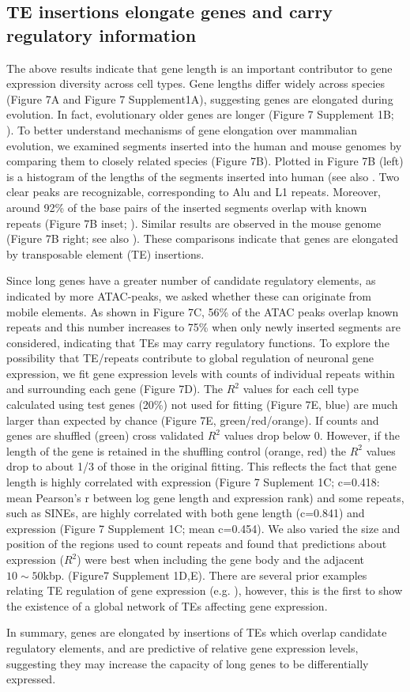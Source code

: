 \subsection{TE insertions elongate genes and carry regulatory information}

The above results indicate that gene length is an important contributor to gene expression diversity across cell types. Gene lengths differ widely across species (Figure 7A and Figure 7 Supplement1A), suggesting genes are elongated during evolution. In fact, evolutionary older genes are longer (Figure 7 Supplement 1B; \cite{Grishkevich_2014}). To better understand mechanisms of gene elongation over mammalian evolution, we examined segments inserted into the human and mouse genomes by comparing them to closely related species (Figure 7B). Plotted in Figure 7B (left) is a histogram of the lengths of the segments inserted into human (see also \cite{Mikkelsen_2005}. Two clear peaks are recognizable, corresponding to Alu and L1 repeats. Moreover, around 92\% of the base pairs of the inserted segments overlap with known repeats (Figure 7B inset; \cite{Bao_2015}). Similar results are observed in the mouse genome (Figure 7B right; see also \cite{Pozzoli_2007}). These comparisons indicate that genes are elongated by transposable element (TE) insertions. 

Since long genes have a greater number of candidate regulatory elements, as indicated by more ATAC-peaks, we asked whether these can originate from mobile elements. As shown in Figure 7C, 56\% of the ATAC peaks overlap known repeats and this number increases to 75\% when only newly inserted segments are considered, indicating that TEs may carry regulatory functions. To explore the possibility that TE/repeats contribute to global regulation of neuronal gene expression, we fit gene expression levels with counts of individual repeats within and surrounding each gene (Figure 7D).  The $R^2$ values for each cell type calculated using test genes (20\%) not used for fitting (Figure 7E, blue) are much larger than expected by chance (Figure 7E, green/red/orange). If counts and genes are shuffled (green) cross validated $R^2$ values drop below 0. However, if the length of the gene is retained in the shuffling control (orange, red) the $R^2$ values drop to about 1/3 of those in the original fitting. This reflects the fact that gene length is highly correlated with expression (Figure 7 Suplement 1C; c=0.418: mean Pearson's r between log gene length and expression rank) and some repeats, such as SINEs, are highly correlated with both gene length (c=0.841) and expression (Figure 7 Supplement 1C; mean c=0.454). We also varied the size and position of the regions used to count repeats and found that predictions about expression ($R^2$) were best when including the gene body and the adjacent $10\sim 50$kbp. (Figure7 Supplement 1D,E). There are several prior examples relating TE regulation of gene expression (e.g. \cite{Han_2004,Chuong_2016a}), however, this is the first to show the existence of a global network of TEs affecting gene expression. 

In summary, genes are elongated by insertions of TEs which overlap candidate regulatory elements, and are predictive of relative gene expression levels, suggesting they may increase the capacity of long genes to be differentially expressed. 



